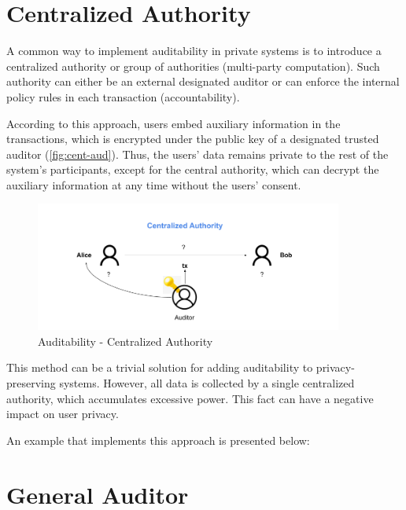 \section{Centralized Authority}

A common way to implement auditability in private systems is to introduce a centralized authority or group of authorities (multi-party computation). Such authority can either be an external designated auditor or can enforce the internal policy rules in each transaction (accountability). 

According to this approach, users embed auxiliary information in the transactions, which is encrypted under the public key of a designated trusted auditor (\autoref{fig:cent-aud}). Thus, the users' data remains private to the rest of the system's participants, except for the central authority, which can decrypt the auxiliary information at any time without the users' consent. 

\begin{figure}
    \centering
    \includegraphics[width=0.9\textwidth]{images/privacy/Auditability in blockchain - Centralized.png}
    \caption{Auditability - Centralized Authority}
    \label{fig:cent-aud}
\end{figure}


This method can be a trivial solution for adding auditability to privacy-preserving systems. However, all data is collected by a single centralized authority, which accumulates excessive power. This fact can have a negative impact on user privacy.

An example that implements this approach is presented below:


% 
% 


\section{General Auditor}

